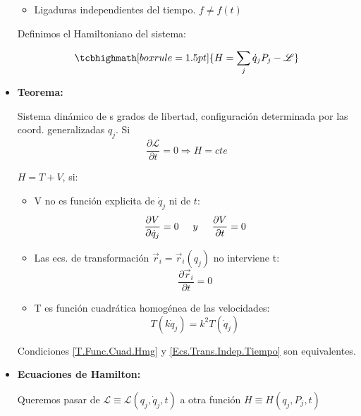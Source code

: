 \documentclass[14pt]{extarticle}
\newcommand{\Lagr}{\mathscr{L}}
\begin{document}
\begin{itemize}
{\begin{itemize}
				\item Ligaduras independientes del tiempo. $f \neq f(t)$
				\end{itemize}

			Definimos el Hamiltoniano del sistema:

			\begin{equation}
				\tcbhighmath[boxrule=1.5pt]{H =  \sum_j \dot{q}_j P_j - \Lagr}
			\end{equation}

			}

			\item{ \textbf{Teorema: } \label{Teorema.Hamilton}

			Sistema dinámico de s grados de libertad, configuración determinada por las coord. generalizadas $q_j$. Si
			\begin{equation}
				\frac{\partial \Lagr}{\partial t} = 0 \Longrightarrow H = cte
			\end{equation}

			$H = T + V$, si:
			\begin{itemize}
			\item V no es función explicita de $\dot{q}_j$ ni de $t$:
				\begin{equation}
					\frac{\partial V}{\partial \dot{q}_j} = 0 \hspace{5mm} y \hspace{5mm} \frac{\partial V}{\partial t} = 0
				\end{equation}

			\item Las ecs. de transformación $\vec{r}_i = \vec{r}_i(q_j)$ no interviene t:
				\begin{equation}
					\frac{\partial \vec{r}_i}{\partial t} = 0
					\label{Ecs.Trans.Indep.Tiempo}
				\end{equation}

			\item T es función cuadrática homogénea de las velocidades:
				\begin{equation}
					T(k \dot{q}_j) = k^2 T(\dot{q}_j)
					\label{T.Func.Cuad.Hmg}
				\end{equation}
			\end{itemize}

			Condiciones \ref{T.Func.Cuad.Hmg} y \ref{Ecs.Trans.Indep.Tiempo} son equivalentes.
			}

			\item{ \textbf{Ecuaciones de Hamilton: }

			Queremos pasar de $\Lagr \equiv \Lagr(q_j, \dot{q}_j, t)$ a otra función $H \equiv H(q_j, P_j, t)$

}
\end{itemize}
\end{document}
